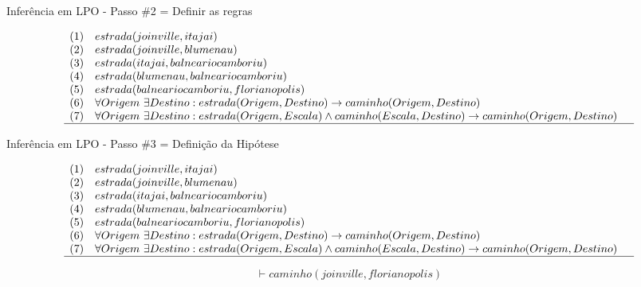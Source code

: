 \begin{frame}[t]{Inferência em LPO - Passo \#2 = Definir as regras}	
	\begin{tiny}
	$$\begin{array}{lll}
	(1) & estrada(joinville, itajai) & \\
	(2) & estrada(joinville, blumenau) & \\
	(3) & estrada(itajai, balneariocamboriu) & \\
	(4) & estrada(blumenau, balneariocamboriu) & \\
	(5) & estrada(balneariocamboriu, florianopolis) & \\
	(6) & \forall Origem ~\exists Destino: estrada(Origem, Destino) \rightarrow caminho(Origem, Destino) & \\
	(7) & \forall Origem ~\exists Destino: estrada(Origem, Escala) \wedge caminho(Escala, Destino) \rightarrow caminho(Origem, Destino) & \\
	\hline
	\end{array}$$	
	\end{tiny}
\end{frame}

\begin{frame}[t]{Inferência em LPO - Passo \#3 = Definição da Hipótese}	
	\begin{tiny}
	$$\begin{array}{lll}
	(1) & estrada(joinville, itajai) & \\
	(2) & estrada(joinville, blumenau) & \\
	(3) & estrada(itajai, balneariocamboriu) & \\
	(4) & estrada(blumenau, balneariocamboriu) & \\
	(5) & estrada(balneariocamboriu, florianopolis) & \\
	(6) & \forall Origem ~\exists Destino: estrada(Origem, Destino) \rightarrow caminho(Origem, Destino) & \\
	(7) & \forall Origem ~\exists Destino: estrada(Origem, Escala) \wedge caminho(Escala, Destino) \rightarrow caminho(Origem, Destino) & \\
	\hline
	\end{array}$$	
	\end{tiny}

	$$\vdash caminho(joinville, florianopolis)$$
\end{frame}

